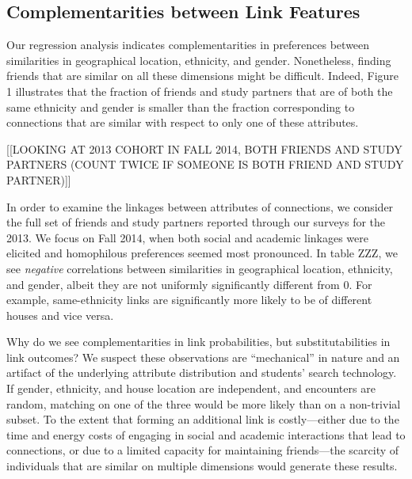 \documentclass[12pt,letterpaper,english]{article}
\begin{document}








\subsection{Complementarities between Link Features}

Our regression analysis indicates complementarities in preferences between similarities in geographical location, ethnicity, and gender. Nonetheless, finding friends that are similar on all these dimensions might be difficult. Indeed, Figure 1 illustrates that the fraction of friends and study partners that are of both the same ethnicity and gender is smaller than the fraction corresponding to connections that are similar with respect to only one of these attributes.





[[LOOKING AT 2013 COHORT IN FALL 2014, BOTH FRIENDS AND STUDY PARTNERS (COUNT TWICE IF SOMEONE IS BOTH FRIEND AND STUDY PARTNER)]]


In order to examine the linkages between attributes of connections, we consider the full set of friends and study partners reported through our surveys for the 2013. We focus on Fall 2014, when both social and academic linkages were elicited and homophilous preferences seemed most pronounced. In table ZZZ, we see \textit{negative} correlations between similarities in geographical location, ethnicity, and gender, albeit they are not uniformly significantly different from $0$. For example, same-ethnicity links are significantly more likely to be of different houses and vice versa. 

Why do we see complementarities in link probabilities, but substitutabilities in link outcomes? We suspect these observations are ``mechanical'' in nature and an artifact of the underlying attribute distribution and students' search technology. If gender, ethnicity, and house location are independent, and encounters are random, matching on one of the three would be more likely than on a non-trivial subset. To the extent that forming an additional link is costly---either due to the time and energy costs of engaging in social and academic interactions that lead to connections, or due to a limited capacity for maintaining friends---the scarcity of individuals that are similar on multiple dimensions would generate these results.
\end{document}
